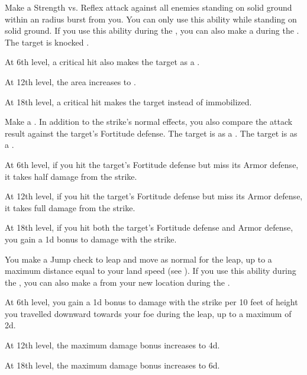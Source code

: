 {             Make a Strength vs. Reflex attack against all enemies standing on solid ground within an \areamed radius burst from you.
            You can only use this ability while standing on solid ground.
            If you use this ability during the , you can also make a  during the .
             The target is knocked \prone.
            \par At 6th level, a critical hit also makes the target \immobilized as a .
            \par At 12th level, the area increases to \arealarge.
            \par At 18th level, a critical hit makes the target \stunned instead of immobilized.

             Make a .
            In addition to the strike's normal effects, you also compare the attack result against the target's Fortitude defense.
             The target is \sickened as a .
             The target is \nauseated as a .
            \par At 6th level, if you hit the target's Fortitude defense but miss its Armor defense, it takes half damage from the strike.
            \par At 12th level, if you hit the target's Fortitude defense but miss its Armor defense, it takes full damage from the strike.
            \par At 18th level, if you hit both the target's Fortitude defense and Armor defense, you gain a \plus1d bonus to damage with the strike.

             You make a Jump check to leap and move as normal for the leap, up to a maximum distance equal to your land speed (see ).
            If you use this ability during the , you can also make a  from your new location during the .
            \par At 6th level, you gain a \plus1d bonus to damage with the strike per 10 feet of height you travelled downward towards your foe during the leap, up to a maximum of \plus2d.
            \par At 12th level, the maximum damage bonus increases to \plus4d.
            \par At 18th level, the maximum damage bonus increases to \plus6d.

}
